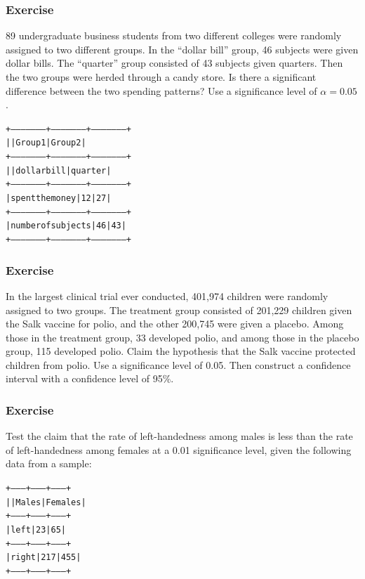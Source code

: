 \documentclass[xcolor=dvipsnames]{beamer}
\begin{document}
\begin{frame}[fragile]
  \frametitle{Exercise}
  {\ubung} 89 undergraduate business students from two different
  colleges were randomly assigned to two different groups. In the
  ``dollar bill'' group, 46 subjects were given dollar bills. The
  ``quarter'' group consisted of 43 subjects given quarters. Then the
  two groups were herded through a candy store. Is there a significant
  difference between the two spending patterns? Use a significance
  level of $\alpha=0.05$.
\begin{alltt}
\footnotesize
+--------------------+--------------------+--------------------+
|                    |      Group 1       |      Group 2       |
+--------------------+--------------------+--------------------+
|                    |    dollar bill     |      quarter       |
+--------------------+--------------------+--------------------+
|  spent the money   |         12         |         27         |
+--------------------+--------------------+--------------------+
| number of subjects |         46         |         43         |
+--------------------+--------------------+--------------------+
\end{alltt}
\end{frame}

\begin{frame}
  \frametitle{Exercise}
  {\ubung} In the largest clinical trial ever conducted, 401,974
  children were randomly assigned to two groups. The treatment group
  consisted of 201,229 children given the Salk vaccine for polio, and
  the other 200,745 were given a placebo. Among those in the treatment
  group, 33 developed polio, and among those in the placebo group, 115
  developed polio. Claim the hypothesis that the Salk vaccine
  protected children from polio. Use a significance level of 0.05.
  Then construct a confidence interval with a confidence level of
  95\%.
\end{frame}

\begin{frame}[fragile]
  \frametitle{Exercise}
  {\ubung} Test the claim that the rate of left-handedness among males
  is less than the rate of left-handedness among females at a 0.01
  significance level, given the following data from a sample:
\begin{alltt}
+--------+--------+--------+
|        | Males  |Females |
+--------+--------+--------+
|  left  |   23   |   65   |
+--------+--------+--------+
| right  |  217   |  455   |
+--------+--------+--------+
\end{alltt}
\end{frame}
\end{document}

